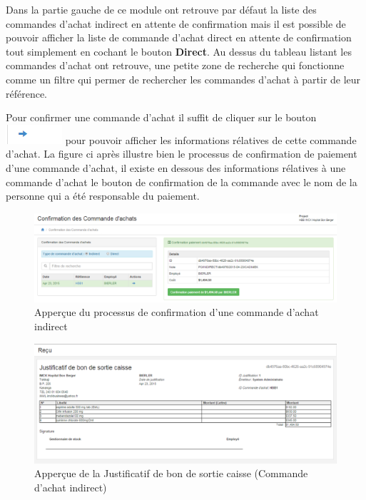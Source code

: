 \documentclass[12pt,a4paper]{report}
\begin{document}
Dans la partie gauche de ce module ont retrouve par défaut la liste des commandes d'achat indirect en attente de confirmation mais il est possible de pouvoir afficher la liste de commande d'achat direct en attente de confirmation tout simplement en cochant le bouton \textbf{Direct}. Au dessus du tableau listant les commandes d'achat ont retrouve, une petite zone de recherche qui fonctionne comme un filtre qui permer de rechercher les commandes d'achat à partir de leur référence.

Pour confirmer une commande d'achat il suffit de cliquer sur le bouton \includegraphics[scale=0.7]{pic/BlueArrow.png} pour pouvoir afficher les informations rélatives de cette commande d'achat. La figure ci après illustre bien le processus de confirmation de paiement d'une commande d'achat, il existe en dessous des informations rélatives à une commande d'achat le bouton de confirmation  de la commande avec le nom de la personne qui a été responsable du paiement.

\begin{figure}[h]
\begin{center}
\includegraphics[width=12cm]{pic/ConfPOAchat.png}
\end{center}
\caption{Apperçue du processus de confirmation d'une commande d'achat indirect}
\label{Apperçue du processus de confirmation d'une commande d'achat indirect}
\end{figure} 

\begin{figure}[h]
\begin{center}
\includegraphics[width=12cm]{pic/JustSonCaisse.png}
\end{center}
\caption{Apperçue de la Justificatif de bon de sortie caisse (Commande d'achat indirect)}
\label{Apperçue de la Justificatif de bon de sortie caisse  (Commande d'achat indirect)}
\end{figure} 
\end{document}
